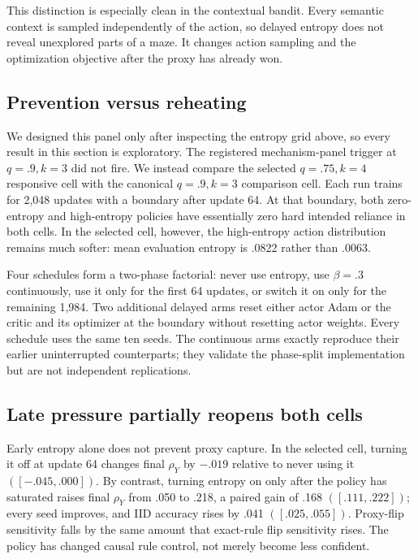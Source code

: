 \documentclass[11pt,a4paper]{article}
\newcommand{\rhoY}{\rho_Y}
\begin{document}
This distinction is especially clean in the contextual bandit. Every semantic context is sampled independently of the action, so delayed entropy does not reveal unexplored parts of a maze. It changes action sampling and the optimization objective after the proxy has already won.

\subsection*{Prevention versus reheating}

We designed this panel only after inspecting the entropy grid above, so every result in this section is exploratory. The registered mechanism-panel trigger at $q=.9,k=3$ did not fire. We instead compare the selected $q=.75,k=4$ responsive cell with the canonical $q=.9,k=3$ comparison cell. Each run trains for 2,048 updates with a boundary after update 64. At that boundary, both zero-entropy and high-entropy policies have essentially zero hard intended reliance in both cells. In the selected cell, however, the high-entropy action distribution remains much softer: mean evaluation entropy is .0822 rather than .0063.

Four schedules form a two-phase factorial: never use entropy, use $\beta=.3$ continuously, use it only for the first 64 updates, or switch it on only for the remaining 1,984. Two additional delayed arms reset either actor Adam or the critic and its optimizer at the boundary without resetting actor weights. Every schedule uses the same ten seeds. The continuous arms exactly reproduce their earlier uninterrupted counterparts; they validate the phase-split implementation but are not independent replications.

\subsection*{Late pressure partially reopens both cells}

Early entropy alone does not prevent proxy capture. In the selected cell, turning it off at update 64 changes final $\rhoY$ by $-.019$ relative to never using it $([-.045,.000])$. By contrast, turning entropy on only after the policy has saturated raises final $\rhoY$ from .050 to .218, a paired gain of .168 $([.111,.222])$; every seed improves, and IID accuracy rises by .041 $([.025,.055])$. Proxy-flip sensitivity falls by the same amount that exact-rule flip sensitivity rises. The policy has changed causal rule control, not merely become less confident.
\end{document}
